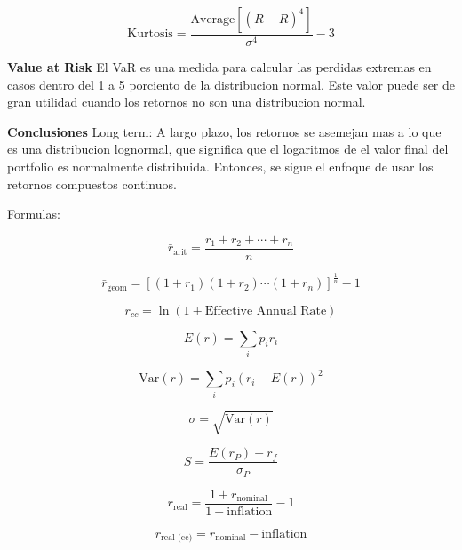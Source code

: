 \documentclass{article}
\begin{document}
\[
\text{Kurtosis} = \frac{\text{Average}\left[(R - \bar{R})^{4}\right]}{\sigma^{4}} - 3
\]

\begin{center}
\end{center}

\textbf{Value at Risk}
El VaR es una medida para calcular las perdidas extremas en casos dentro del 1 a 5 porciento de la distribucion normal. Este valor
 puede ser de gran utilidad cuando los retornos no son una distribucion normal.

\textbf{Conclusiones}
Long term: A largo plazo, los retornos se asemejan mas a lo que es una distribucion lognormal, que significa que el logaritmos
de el valor final del portfolio es normalmente distribuida. Entonces, se sigue el enfoque de usar los retornos compuestos continuos.

Formulas:

\[
\bar{r}_{\text{arit}} = \frac{r_1 + r_2 + \cdots + r_n}{n}
\]

\[
\bar{r}_{\text{geom}} = \left[(1 + r_1)(1 + r_2) \cdots (1 + r_n)\right]^{\frac{1}{n}} - 1
\]

\[
r_{cc} = \ln(1 + \text{Effective Annual Rate})
\]

\[
E(r) = \sum_{i} p_i r_i
\]

\[
\mathrm{Var}(r) = \sum_{i} p_i \left(r_i - E(r)\right)^2
\]

\[
\sigma = \sqrt{\mathrm{Var}(r)}
\]

\[
S = \frac{E(r_P) - r_f}{\sigma_P}
\]

\[
r_{\text{real}} = \frac{1 + r_{\text{nominal}}}{1 + \text{inflation}} - 1
\]

\[
r_{\text{real (cc)}} = r_{\text{nominal}} - \text{inflation}
\]
\end{document}
